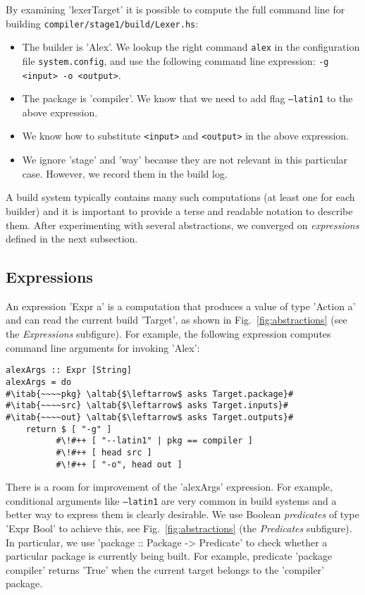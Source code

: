 \noindent By examining \lst'lexerTarget' it is possible to compute the full
command line for building \texttt{compiler/stage1/build/Lexer.hs}:
\begin{itemize}
  \item The builder is \lst'Alex'. We lookup the right command
  \texttt{alex} in the configuration file \texttt{system.config}, and use the
  following command line expression: \texttt{-g <input> -o <output>}.
  \item The package is \lst'compiler'. We know that we need to add
  flag \texttt{--latin1} to the above expression.
  \item We know how to substitute \texttt{<input>} and \texttt{<output>} in the
  above expression.
  \item We ignore \lst'stage' and \lst'way' because they are not relevant
  in this particular case. However, we record them in the build log.
\end{itemize}

\noindent A build system typically contains many such computations (at least one
for each builder) and it is important to provide a terse and readable notation to
describe them. After experimenting with several abstractions, we converged on
\emph{expressions} defined in the next subsection.

\subsection{Expressions}

An expression \lst'Expr a' is a computation that produces a value of type
\lst'Action a' and can read the current build \lst'Target', as shown in
Fig.~\ref{fig:abstractions} (see the \emph{Expressions} subfigure). For example,
the following expression computes command line arguments for invoking \lst'Alex':

\newcommand{\altab}[1]{\hspace{.05\textwidth}\rlap{#1}}

\begin{lstlisting}
alexArgs :: Expr [String]
alexArgs = do
#\itab{~~~~pkg} \altab{$\leftarrow$ asks Target.package}#
#\itab{~~~~src} \altab{$\leftarrow$ asks Target.inputs}#
#\itab{~~~~out} \altab{$\leftarrow$ asks Target.outputs}#
    return $ [ "-g" ]
          #\!#++ [ "--latin1" | pkg == compiler ]
          #\!#++ [ head src ]
          #\!#++ [ "-o", head out ]
\end{lstlisting}

There is a room for improvement of the \lst'alexArgs' expression. For
example, conditional arguments like \texttt{--latin1} are very common in build
systems and a better way to express them is clearly desirable. We use Boolean
\emph{predicates} of type \lst'Expr Bool' to achieve this, see
Fig.~\ref{fig:abstractions} (the \emph{Predicates} subfigure). In particular, we
use \lst'package :: Package -> Predicate' to check whether a particular package
is currently being built. For example, predicate \lst'package compiler'
returns \lst'True' when the current target belongs to the \lst'compiler'
package.

